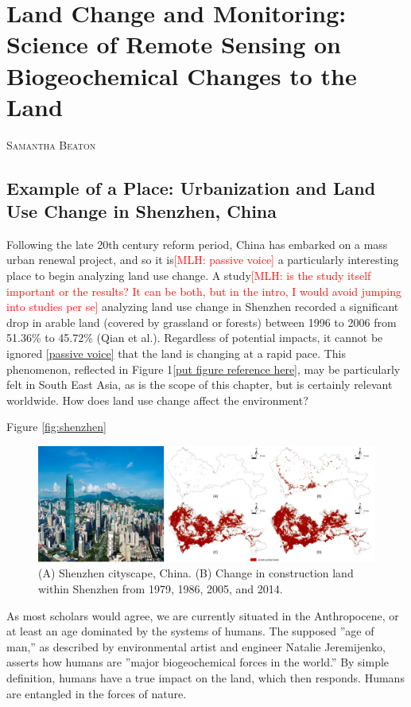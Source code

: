 \documentclass{book}\usepackage{knitr}
\makeatletter
\newcommand{\red}[1]{\textcolor{red}{[MLH: #1]}}
\newcommand{\chapterauthor}[1]{%
  {\parindent0pt\vspace*{-25pt}%
  \linespread{1.1}\large\scshape#1%
  \par\nobreak\vspace*{35pt}}
  \@afterheading%
}
\makeatother
\begin{document}
\chapter[header short chapter name]{Land Change and Monitoring: Science of Remote Sensing on Biogeochemical Changes to the Land}

\chapterauthor{Samantha Beaton}

\section{Example of a Place: Urbanization and Land Use Change in Shenzhen, China}

Following the late 20th century reform period, China has embarked on a mass urban renewal project, and so it is\red{passive voice} a particularly interesting place to begin analyzing land use change. A study\red{is the study itself important or the results? It can be both, but in the intro, I would avoid jumping into studies per se} analyzing land use change in Shenzhen recorded a significant drop in arable land (covered by grassland or forests) between 1996 to 2006 from 51.36\% to 45.72\% (Qian et al.). Regardless of potential impacts, it cannot be ignored \ref{passive voice} that the land is changing at a rapid pace. This phenomenon, reflected in Figure 1\ref{put figure reference here}, may be particularly felt in South East Asia, as is the scope of this chapter, but is certainly relevant worldwide. How does land use change affect the environment?

Figure \ref{fig:shenzhen}

\begin{figure}
\includegraphics[width=\linewidth]{images/land-use/Shenzhen-cityscape.png}
\caption{(A) Shenzhen cityscape, China. (B) Change in construction land within Shenzhen from 1979, 1986, 2005, and 2014.}
\label{figure:shenzen}
\end{figure}

As most scholars would agree, we are currently situated in the Anthropocene, or at least an age dominated by the systems of humans. The supposed ''age of man,'' as described by environmental artist and engineer Natalie Jeremijenko, asserts how humans are ''major biogeochemical forces in the world.'' By simple definition, humans have a true impact on the land, which then responds. Humans are entangled in the forces of nature. 
\end{document}
